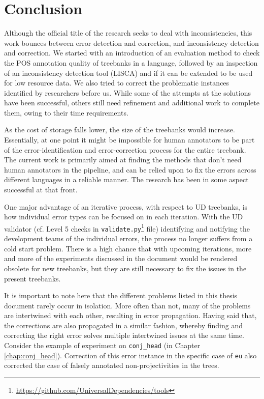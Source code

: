 \chapter*{Conclusion}

Although the official title of the research seeks to deal with inconsistencies, this work bounces between error detection and correction, and inconsistency detection and correction. We started with an introduction of an evaluation method to check the POS annotation quality of treebanks in a language, followed by an inspection of an inconsistency detection tool (LISCA) and if it can be extended to be used for low resource data. We also tried to correct the problematic instances identified by researchers before us. While some of the attempts at the solutions have been successful, others still need refinement and additional work to complete them, owing to their time requirements.

As the cost of storage falls lower, the size of the treebanks would increase. Essentially, at one point it might be impossible for human annotators to be part of the error-identification and error-correction process for the entire treebank. The current work is primarily aimed at finding the methods that don't need human annotators in the pipeline, and can be relied upon to fix the errors across different languages in a reliable manner. The research has been in some aspect successful at that front.

One major advantage of an iterative process, with respect to UD treebanks, is how individual error types can be focused on in each iteration. With the UD validator (cf. Level 5 checks in \verb|validate.py|\footnote{\url{https://github.com/UniversalDependencies/tools}} file) identifying and notifying the development teams of the individual errors, the process no longer suffers from a cold start problem. There is a high chance that with upcoming iterations, more and more of the experiments discussed in the document would be rendered obsolete for new treebanks, but they are still necessary to fix the issues in the present treebanks.

It is important to note here that the different problems listed in this thesis document rarely occur in isolation. More often than not, many of the problems are intertwined with each other, resulting in error propagation. Having said that, the corrections are also propagated in a similar fashion, whereby finding and correcting the right error solves multiple intertwined issues at the same time. Consider the example of experiment on \texttt{conj\_head} (in Chapter \ref{chap:conj_head}). Correction of this error instance in the specific case of \verb|eu| also corrected the case of falsely annotated non-projectivities in the trees.

